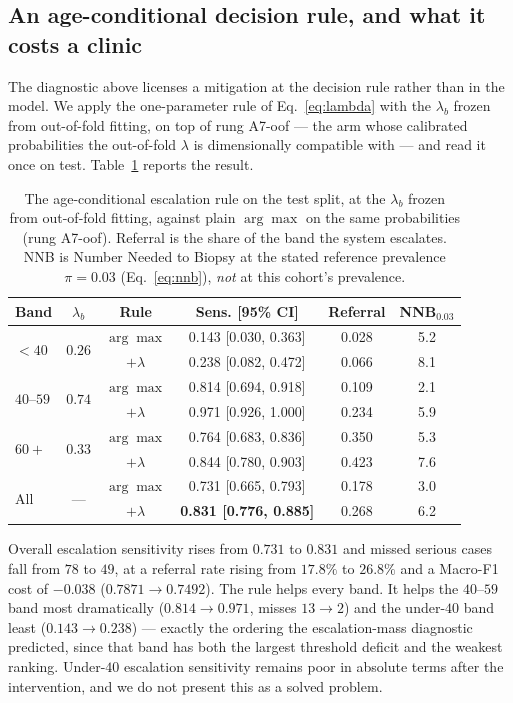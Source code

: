 \documentclass[journal]{IEEEtran}
\begin{document}
\subsection{An age-conditional decision rule, and what it costs a clinic}
\label{sec:results-utility}

The diagnostic above licenses a mitigation at the decision rule rather than in the model. We
apply the one-parameter rule of Eq.~\eqref{eq:lambda} with the $\lambda_b$ frozen from
out-of-fold fitting, on top of rung A7-oof --- the arm whose calibrated probabilities the
out-of-fold $\lambda$ is dimensionally compatible with --- and read it once on test.
Table~\ref{tab:agerule} reports the result.

\begin{table}[t]
\centering
\caption{The age-conditional escalation rule on the test split, at the $\lambda_b$ frozen from
out-of-fold fitting, against plain $\arg\max$ on the same probabilities (rung A7-oof).
Referral is the share of the band the system escalates. NNB is Number Needed to Biopsy at the
stated reference prevalence $\pi=0.03$ (Eq.~\eqref{eq:nnb}), \emph{not} at this cohort's
prevalence.}
\label{tab:agerule}
\setlength{\tabcolsep}{4pt}
\begin{tabular}{lccccc}
\toprule
Band & $\lambda_b$ & Rule & Sens. [95\% CI] & Referral & NNB$_{0.03}$ \\
\midrule
\multirow{2}{*}{$<40$} & \multirow{2}{*}{$0.26$}
  & $\arg\max$ & 0.143 [0.030, 0.363] & 0.028 & 5.2 \\
  & & $+\lambda$ & 0.238 [0.082, 0.472] & 0.066 & 8.1 \\
\midrule
\multirow{2}{*}{$40$--$59$} & \multirow{2}{*}{$0.74$}
  & $\arg\max$ & 0.814 [0.694, 0.918] & 0.109 & 2.1 \\
  & & $+\lambda$ & 0.971 [0.926, 1.000] & 0.234 & 5.9 \\
\midrule
\multirow{2}{*}{$60+$} & \multirow{2}{*}{$0.33$}
  & $\arg\max$ & 0.764 [0.683, 0.836] & 0.350 & 5.3 \\
  & & $+\lambda$ & 0.844 [0.780, 0.903] & 0.423 & 7.6 \\
\midrule
\multirow{2}{*}{All} & \multirow{2}{*}{---}
  & $\arg\max$ & 0.731 [0.665, 0.793] & 0.178 & 3.0 \\
  & & $+\lambda$ & \textbf{0.831 [0.776, 0.885]} & 0.268 & 6.2 \\
\bottomrule
\end{tabular}
\end{table}

Overall escalation sensitivity rises from $0.731$ to $0.831$ and missed serious cases fall
from $78$ to $49$, at a referral rate rising from $17.8\%$ to $26.8\%$ and a Macro-F1 cost of
$-0.038$ ($0.7871 \rightarrow 0.7492$). The rule helps every band. It helps the $40$--$59$
band most dramatically ($0.814 \rightarrow 0.971$, misses $13 \rightarrow 2$) and the
under-$40$ band least ($0.143 \rightarrow 0.238$) --- exactly the ordering the escalation-mass
diagnostic predicted, since that band has both the largest threshold deficit and the weakest
ranking. Under-$40$ escalation sensitivity remains poor in absolute terms after the
intervention, and we do not present this as a solved problem.
\end{document}
